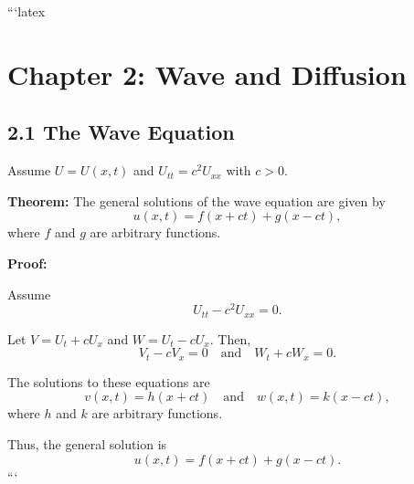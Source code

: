 ```latex
\section*{Chapter 2: Wave and Diffusion}

\subsection*{2.1 The Wave Equation}

Assume \( U = U(x, t) \) and \( U_{tt} = c^2 U_{xx} \) with \( c > 0 \).

\textbf{Theorem:} The general solutions of the wave equation are given by
\[
u(x, t) = f(x + ct) + g(x - ct),
\]
where \( f \) and \( g \) are arbitrary functions.

\textbf{Proof:}

Assume
\[
U_{tt} - c^2 U_{xx} = 0.
\]

Let \( V = U_t + c U_x \) and \( W = U_t - c U_x \). Then,
\[
V_t - c V_x = 0 \quad \text{and} \quad W_t + c W_x = 0.
\]

The solutions to these equations are
\[
v(x, t) = h(x + ct) \quad \text{and} \quad w(x, t) = k(x - ct),
\]
where \( h \) and \( k \) are arbitrary functions.

Thus, the general solution is
\[
u(x, t) = f(x + ct) + g(x - ct).
\]
```
